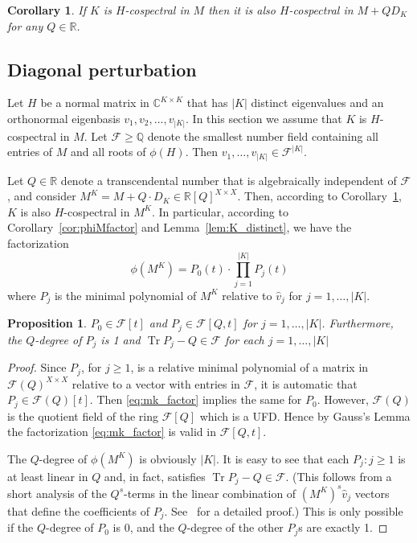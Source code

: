 \documentclass[11pt]{article}
\newtheorem{prop}[theo]{Proposition}
\newtheorem{coro}[theo]{Corollary}
\theoremstyle{definition}
\numberwithin{equation}{section}
\newcommand\+{\mkern2mu}
\newcommand{\R}{\mathbb{R}}
\newcommand{\C}{\mathbb{C}}
\newcommand{\Q}{\mathbb{Q}}
\newcommand{\F}{\mathcal{F}}
\newcommand{\1}{\mathbf 1}
\DeclareMathOperator{\Tr}{Tr}
\begin{document}
\begin{coro}\label{cor:potential}
If $K$ is $H$-cospectral in $M$ then it is also $H$-cospectral in $M + Q D_K$ for any $Q \in \R$.
\end{coro}

\subsection{Diagonal perturbation}

Let $H$ be a normal matrix in $\C^{K \times K}$ that has $|K|$ distinct eigenvalues and an orthonormal eigenbasis $v_1, v_2, \dots, v_{|K|}$. In this section we assume that $K$ is $H$-cospectral in $M$. Let $\F \geq \Q$ denote the smallest number field containing all entries of  $M$ and all roots of $\phi(H)$. Then $v_1,\dots, v_{|K|} \in \F^{|K|}$. 

Let $Q \in \R$ denote a transcendental number that is algebraically independent of $\F$, and consider $M^K = M + Q \cdot D_K \in \R[Q]^{X \times X}$. Then, according to Corollary~\ref{cor:potential}, $K$ is also $H$-cospectral in $M^K$. In particular, according to Corollary~\ref{cor:phiMfactor} and Lemma~\ref{lem:K_distinct}, we have the factorization
\begin{equation}\label{eq:mk_factor} \phi(M^K) = P_0(t) \cdot \prod_{j=1}^{|K|} P_j(t) \end{equation} where $P_j$ is the minimal polynomial of $M^K$ relative to $\hat{v}_j$ for $j=1,\dots, |K|$. 

\begin{prop}\label{clm:deg_tr}
$P_0 \in \F[t]$ and $P_j \in \F[Q,t]$ for $j = 1,\dots,|K|$. Furthermore, the $Q$-degree of $P_j$ is 1  and $\Tr P_j - Q \in \F$ for each $j=1,\dots,|K|$
\end{prop}

\begin{proof}
Since $P_j$, for $j \geq 1$, is a relative minimal polynomial of a matrix in $\F(Q)^{X \times X}$ relative to a vector with entries in $\F$, it is automatic that $P_j \in \F(Q)[t]$. Then \eqref{eq:mk_factor} implies the same for $P_0$. However, $\F(Q)$ is the quotient field of the ring $\F[Q]$ which is a UFD. Hence by Gauss's Lemma the factorization \eqref{eq:mk_factor} is valid in $\F[Q,t]$.

The $Q$-degree of $\phi(M^K)$ is obviously $|K|$. It is easy to see that each $P_j : j \geq 1$ is at least linear in $Q$ and, in fact, satisfies $\Tr P_j - Q \in \F$. (This follows from a short analysis of the $Q^s$-terms in the linear combination of $(M^K)^s \hat{v}_j$ vectors that define the coefficients of $P_j$. See~\cite[Lemma 3.3]{eisenberg2019pretty} for a detailed proof.) This is only possible if the $Q$-degree of $P_0$ is 0, and the $Q$-degree of the other $P_j$s are exactly 1.
\end{proof}
\end{document}
